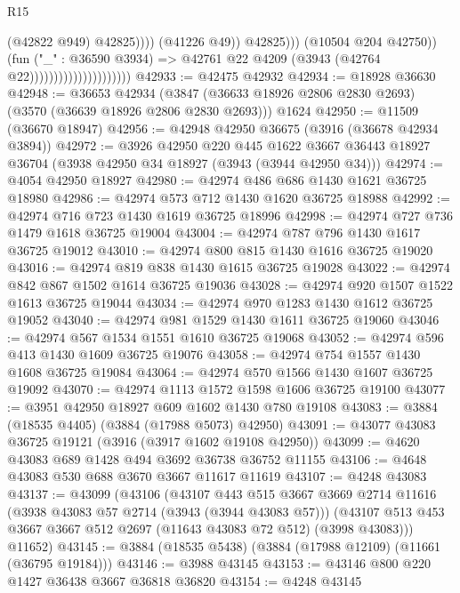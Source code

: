 \begin{lexlean}{R15}
\begin{coremodule}
                                                          (@42822 @949)
                                                          @42825))))
                                                  (@41226 @49))
                                                @42825)))
                                          (@10504 @204 @42750))
                                        (fun ("_" : @36590 @3934) =>
                                        @42761 @22 @4209 (@3943 (@42764 @22)))))))))))))))))))))
@42933 := @42475 @42932
@42934 := @18928 @36630
@42948 := @36653
    @42934
    (@3847 (@36633 @18926 @2806 @2830 @2693) (@3570 (@36639 @18926 @2806 @2830 @2693)))
    @1624
@42950 := @11509 (@36670 @18947)
@42956 := @42948 @42950 @36675 (@3916 (@36678 @42934 @3894))
@42972 := @3926
    @42950
    @220
    @445
    @1622
    @3667
    @36443
    @18927
    @36704
    (@3938 @42950 @34 @18927 (@3943 (@3944 @42950 @34)))
@42974 := @4054 @42950 @18927
@42980 := @42974 @486 @686 @1430 @1621 @36725 @18980
@42986 := @42974 @573 @712 @1430 @1620 @36725 @18988
@42992 := @42974 @716 @723 @1430 @1619 @36725 @18996
@42998 := @42974 @727 @736 @1479 @1618 @36725 @19004
@43004 := @42974 @787 @796 @1430 @1617 @36725 @19012
@43010 := @42974 @800 @815 @1430 @1616 @36725 @19020
@43016 := @42974 @819 @838 @1430 @1615 @36725 @19028
@43022 := @42974 @842 @867 @1502 @1614 @36725 @19036
@43028 := @42974 @920 @1507 @1522 @1613 @36725 @19044
@43034 := @42974 @970 @1283 @1430 @1612 @36725 @19052
@43040 := @42974 @981 @1529 @1430 @1611 @36725 @19060
@43046 := @42974 @567 @1534 @1551 @1610 @36725 @19068
@43052 := @42974 @596 @413 @1430 @1609 @36725 @19076
@43058 := @42974 @754 @1557 @1430 @1608 @36725 @19084
@43064 := @42974 @570 @1566 @1430 @1607 @36725 @19092
@43070 := @42974 @1113 @1572 @1598 @1606 @36725 @19100
@43077 := @3951 @42950 @18927 @609 @1602 @1430 @780 @19108
@43083 := @3884 (@18535 @4405) (@3884 (@17988 @5073) @42950)
@43091 := @43077 @43083 @36725 @19121 (@3916 (@3917 @1602 @19108 @42950))
@43099 := @4620 @43083 @689 @1428 @494 @3692 @36738 @36752 @11155
@43106 := @4648 @43083 @530 @688 @3670 @3667 @11617 @11619
@43107 := @4248 @43083
@43137 := @43099
    (@43106
      (@43107
        @443
        @515
        @3667
        @3669
        @2714
        @11616
        (@3938 @43083 @57 @2714 (@3943 (@3944 @43083 @57)))
        (@43107 @513 @453 @3667 @3667 @512 @2697 (@11643 @43083 @72 @512) (@3998 @43083)))
      @11652)
@43145 := @3884 (@18535 @5438) (@3884 (@17988 @12109) (@11661 (@36795 @19184)))
@43146 := @3988 @43145
@43153 := @43146 @800 @220 @1427 @36438 @3667 @36818 @36820
@43154 := @4248 @43145

\end{coremodule}
\end{lexlean}
